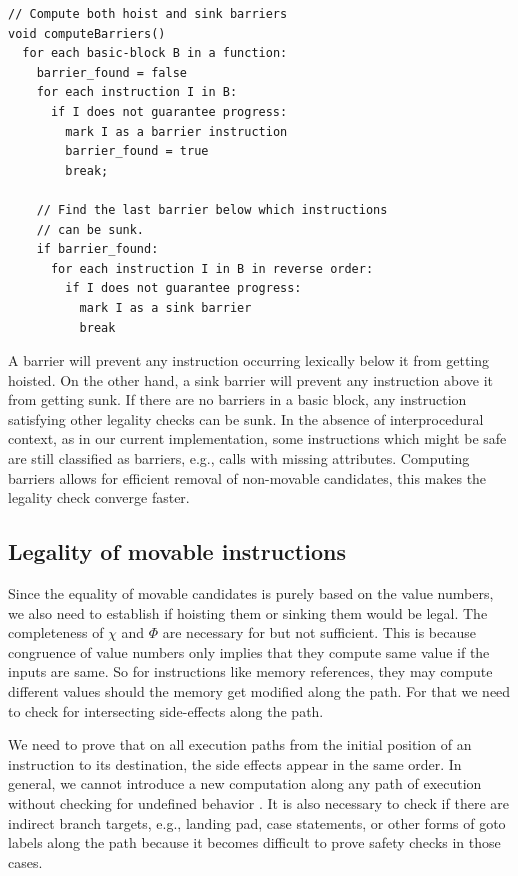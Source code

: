 \documentclass[sigplan,10pt,review,anonymous]{acmart}\settopmatter{printfolios=true,printccs=false,printacmref=false}
\begin{document}
\begin{lstlisting}[caption={Compute hoist and sink barriers},captionpos=b,label={algo:barriers}]
// Compute both hoist and sink barriers
void computeBarriers()
  for each basic-block B in a function:
    barrier_found = false
    for each instruction I in B:
      if I does not guarantee progress:
        mark I as a barrier instruction
        barrier_found = true
        break;

    // Find the last barrier below which instructions
    // can be sunk.
    if barrier_found:
      for each instruction I in B in reverse order:
        if I does not guarantee progress:
          mark I as a sink barrier
          break
\end{lstlisting}


A barrier will prevent any instruction occurring lexically below it from getting
hoisted. On the other hand, a sink barrier will prevent any instruction above it
from getting sunk. If there are no barriers in a basic block, any instruction
satisfying other legality checks can be sunk.  In the absence of interprocedural
context, as in our current implementation, some instructions which might be safe
are still classified as barriers, e.g., calls with missing attributes.
Computing barriers allows for efficient removal of non-movable candidates, this
makes the legality check converge faster.

\subsection{Legality of movable instructions}
\label{subsec:legality}
Since the equality of movable candidates is purely based on the value numbers,
we also need to establish if hoisting them or sinking them would be legal. The
completeness of $\chi$ and $\Phi$ are necessary for \GCM{} but not
sufficient. This is because congruence of value numbers only implies that they
compute same value if the inputs are same. So for instructions like memory
references, they may compute different values should the memory get modified
along the path. For that we need to check for intersecting side-effects along
the path.

We need to prove that on all execution paths from the initial position of an
instruction to its destination, the side effects appear in the same order. In
general, we cannot introduce a new computation along any path of execution
without checking for undefined behavior \cite{undef}. It is also necessary to
check if there are indirect branch targets, e.g., landing pad, case statements,
or other forms of goto labels along the path because it becomes difficult to
prove safety checks in those cases.
\end{document}
